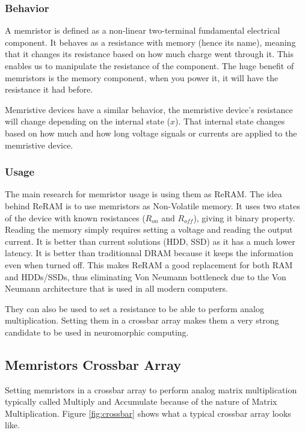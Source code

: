 \subsubsection{Behavior}
A memristor is defined as a non-linear two-terminal fundamental electrical component. It behaves as a resistance with memory (hence its name), meaning that it changes its resistance based on how much charge went through it. This enables us to manipulate the resistance of the component.
The huge benefit of memristors is the memory component, when you power it, it will have the resistance it had before.

Memristive devices have a similar behavior, the memristive device's resistance will change depending on the internal state ($x$). That internal state changes based on how much and how long voltage signals or currents are applied to the memristive device.

\subsubsection{Usage}
The main research for memristor usage is using them as ReRAM. The idea behind ReRAM is to use memristors as Non-Volatile memory. It uses two states of the device with known resistances ($R_{on}$ and $R_{off}$), giving it binary property. Reading the memory simply requires setting a voltage and reading the output current. It is better than current solutions (HDD, SSD) as it has a much lower latency. It is better than traditionnal DRAM because it keeps the information even when turned off. This makes ReRAM a good replacement for both RAM and HDDs/SSDs, thus eliminating Von Neumann bottleneck due to the Von Neumann architecture that is used in all modern computers.

They can also be used to set a resistance to be able to perform analog multiplication. Setting them in a crossbar array makes them a very strong candidate to be used in neuromorphic computing.

\subsection{Memristors Crossbar Array}\label{subsec:crossbar}

Setting memristors in a crossbar array to perform analog matrix multiplication typically called Multiply and Accumulate because of the nature of Matrix Multiplication. Figure \ref{fig:crossbar} shows what a typical crossbar array looks like.

